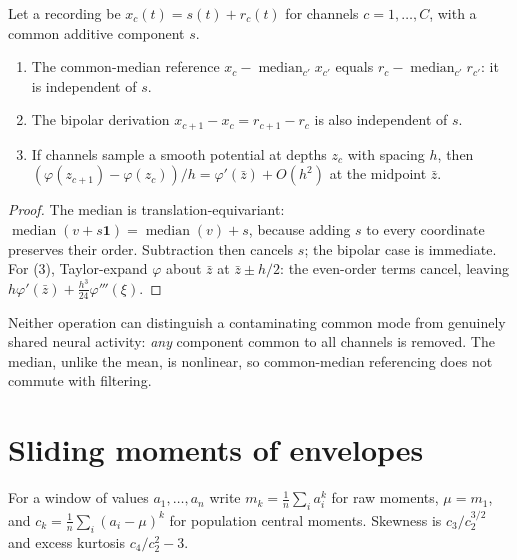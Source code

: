 \begin{theorem}\label{ars:rob-002}
Let a recording be $x_c(t)=s(t)+r_c(t)$ for channels $c=1,\dots,C$, with a common additive component $s$.
\begin{enumerate}[leftmargin=2em]
\item The common-median reference $x_c-\operatorname{median}_{c'}x_{c'}$ equals $r_c-\operatorname{median}_{c'}r_{c'}$: it is independent of $s$.
\item The bipolar derivation $x_{c+1}-x_c=r_{c+1}-r_c$ is also independent of $s$.
\item If channels sample a smooth potential at depths $z_c$ with spacing $h$, then $(\varphi(z_{c+1})-\varphi(z_c))/h=\varphi'(\bar z)+O(h^2)$ at the midpoint $\bar z$.
\end{enumerate}
\end{theorem}
\begin{proof}
The median is translation-equivariant: $\operatorname{median}(v+s\mathbf 1)=\operatorname{median}(v)+s$, because adding $s$ to every coordinate preserves their order. Subtraction then cancels $s$; the bipolar case is immediate. For (3), Taylor-expand $\varphi$ about $\bar z$ at $\bar z\pm h/2$: the even-order terms cancel, leaving $h\varphi'(\bar z)+\tfrac{h^3}{24}\varphi'''(\xi)$.
\end{proof}
\begin{remark}
Neither operation can distinguish a contaminating common mode from genuinely shared neural activity: \emph{any} component common to all channels is removed. The median, unlike the mean, is nonlinear, so common-median referencing does not commute with filtering.
\end{remark}

\section{Sliding moments of envelopes}
For a window of values $a_1,\dots,a_n$ write $m_k=\frac1n\sum_ia_i^k$ for raw moments, $\mu=m_1$, and $c_k=\frac1n\sum_i(a_i-\mu)^k$ for population central moments. Skewness is $c_3/c_2^{3/2}$ and excess kurtosis $c_4/c_2^2-3$.

